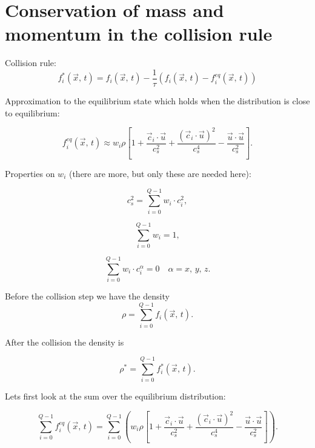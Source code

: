

\section{Conservation of mass and momentum in the collision rule}


Collision rule:
\begin{equation}
    f_i^*(\vec{x}, \, t) = f_i(\vec{x}, \, t) - \frac{1}{\tau}(f_i(\vec{x},\, t) - f_i^{eq}(\vec{x}, \, t))
\label{collision}
\end{equation}


Approximation to the equilibrium state which holds when the distribution is close to equilibrium:

\begin{equation}
    f_i^{eq}(\vec{x}, \, t) \approx w_i\rho 
    \left[ 1 + 
    \frac{ \vec{c}_i \cdot \vec{u} }{c_s^2} + 
    \frac{(\vec{c}_i \cdot \vec{u})^2}{c_s^4} -
    \frac{\vec{u}\cdot\vec{u}}{c_s^2}
    \right].
\label{approx}
\end{equation}

Properties on $w_i$ (there are more, but only these are needed here):

\begin{equation}
    c_s^2 = \sum_{i=0}^{Q-1} w_i\cdot c_i ^2,
\label{prop1}
\end{equation}

\begin{equation}
    \sum_{i=0}^{Q-1} w_i = 1,
\label{prop2}
\end{equation}

\begin{equation}
    \sum_{i=0}^{Q-1} w_i \cdot c_i^\alpha = 0 \quad  \alpha = x,\, y, \, z.
\label{prop3}
\end{equation}

Before the collision step we have the density
\begin{equation}
\rho = \sum_{i=0}^{Q-1} f_i(\vec{x}, \, t) .
\end{equation}

After the collision the density is

\begin{equation}
    \rho^* = \sum_{i=0}^{Q-1} f_i^*(\vec{x}, \, t).
\end{equation}


Lets first look at the sum over the equilibrium distribution:

\begin{equation}
    \sum_{i=0}^{Q-1} f_i^{eq}(\vec{x}, \, t) =  \sum_{i=0}^{Q-1} \left( 
     w_i\rho \left[ 1 + 
    \frac{ \vec{c}_i \cdot \vec{u} }{c_s^2} + 
    \frac{(\vec{c}_i \cdot \vec{u})^2}{c_s^4} -
    \frac{\vec{u}\cdot\vec{u}}{c_s^2}
    \right]
    \right).
\label{sum_eq}
\end{equation}


